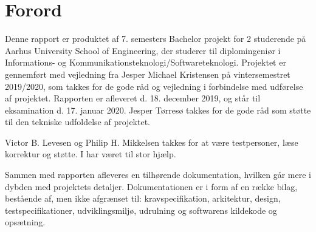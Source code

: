 \chapter{Forord}

Denne rapport er produktet af 7. semesters Bachelor projekt for 2 studerende på Aarhus University School of Engineering, der studerer til diplomingeniør i Informations- og Kommunikationsteknologi/Softwareteknologi. Projektet er gennemført med vejledning fra Jesper Michael Kristensen på vintersemestret 2019/2020, som takkes for de gode råd og vejledning i forbindelse med udførelse af projektet. Rapporten er afleveret d. 18. december 2019, og står til eksamination d. 17. januar 2020. Jesper Tørresø takkes for de gode råd som støtte til den tekniske udfoldelse af projektet.

Victor B. Levesen og Philip H. Mikkelsen takkes for at være testpersoner, læse korrektur og støtte. I har været til stor hjælp.

Sammen med rapporten afleveres en tilhørende dokumentation, hvilken går mere i dybden med projektets detaljer. Dokumentationen er i form af en række bilag, bestående af, men ikke afgrænset til: kravspecifikation, arkitektur, design, testspecifikationer, udviklingsmiljø, udrulning og softwarens kildekode og opsætning.
